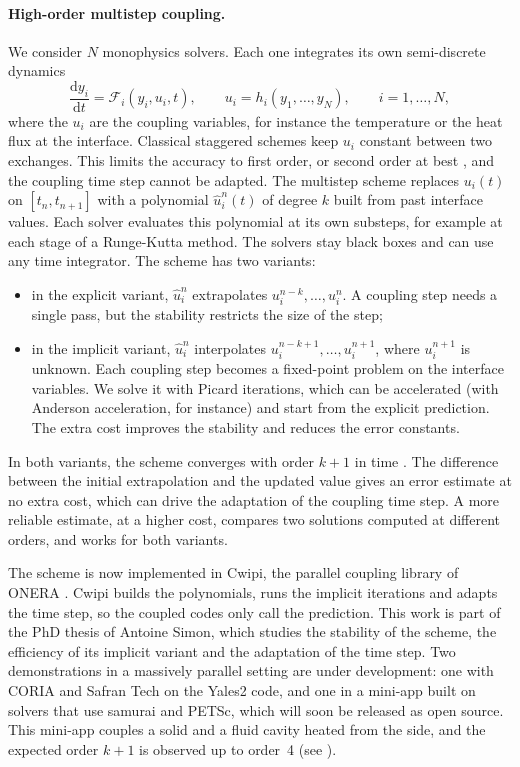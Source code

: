 \paragraph{High-order multistep coupling.}\label{sec:wp1:t1.7:multistep}
We consider $N$ monophysics solvers. Each one integrates its own semi-discrete
dynamics
\begin{equation}\label{eq:wp1:t1.7:multistep}
  \frac{\mathrm{d}y_i}{\mathrm{d}t} = \mathcal{F}_i(y_i, u_i, t),
  \qquad u_i = h_i(y_1, \dots, y_N),
  \qquad i = 1, \dots, N,
\end{equation}
where the $u_i$ are the coupling variables, for instance the temperature or the
heat flux at the interface. Classical staggered schemes keep $u_i$ constant
between two exchanges. This limits the accuracy to first order, or second order
at best \cite{farhat_two_2000}, and the coupling time step cannot be adapted.
The multistep scheme \cite{francois_multistep_2023,simon_high-order_2025}
replaces $u_i(t)$ on $[t_n, t_{n+1}]$ with a polynomial $\hat{u}_i^n(t)$ of
degree $k$ built from past interface values. Each solver evaluates this
polynomial at its own substeps, for example at each stage of a Runge-Kutta
method. The solvers stay black boxes and can use any time integrator. The scheme
has two variants:
\begin{itemize}
\item in the explicit variant, $\hat{u}_i^n$ extrapolates
  $u_i^{n-k}, \dots, u_i^n$. A coupling step needs a single pass, but the
  stability restricts the size of the step;
\item in the implicit variant, $\hat{u}_i^n$ interpolates
  $u_i^{n-k+1}, \dots, u_i^{n+1}$, where $u_i^{n+1}$ is unknown. Each coupling
  step becomes a fixed-point problem on the interface variables. We solve it
  with Picard iterations, which can be accelerated (with Anderson acceleration,
  for instance) and start from the explicit prediction. The extra cost improves
  the stability and reduces the error constants.
\end{itemize}
In both variants, the scheme converges with order $k+1$ in time
\cite{simon_high-order_2025}. The difference between the initial extrapolation
and the updated value gives an error estimate at no extra cost, which can drive
the adaptation of the coupling time step. A more reliable estimate, at a higher
cost, compares two solutions computed at different orders, and works for both
variants.

The scheme is now implemented in Cwipi, the parallel coupling library of ONERA
\cite{quemerais_cwipi_2026}. Cwipi builds the
polynomials, runs the implicit iterations and adapts the time step, so the
coupled codes only call the prediction. This work is part of the PhD thesis of
Antoine Simon, which studies the stability of the scheme, the efficiency of its
implicit variant and the adaptation of the time step. Two demonstrations in a
massively parallel setting are under development: one with CORIA and Safran
Tech on the Yales2 code, and one in a mini-app built on solvers that use samurai
and PETSc, which will soon be released as open source. This mini-app couples a
solid and a fluid cavity heated from the side, and the expected order $k+1$ is
observed up to order~4 (see ).


